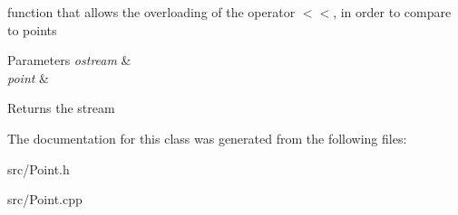 function that allows the overloading of the operator $<$$<$, in order to compare to points 


\begin{DoxyParams}{Parameters}
{\em ostream} & \\
\hline
{\em point} & \\
\hline
\end{DoxyParams}
\begin{DoxyReturn}{Returns}
the stream 
\end{DoxyReturn}


The documentation for this class was generated from the following files\+:\begin{DoxyCompactItemize}
\item 
src/Point.\+h\item 
src/Point.\+cpp\end{DoxyCompactItemize}
